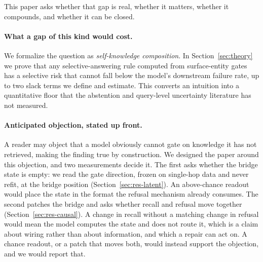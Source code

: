 \documentclass{article}
\begin{document}
This paper asks whether that gap is real, whether it matters, whether it compounds, and whether it
can be closed.

\paragraph{What a gap of this kind would cost.} We formalize the question as \emph{self-knowledge
composition}. In Section~\ref{sec:theory} we prove that any selective-answering rule computed from
surface-entity gates has a selective risk that cannot fall below the model's downstream failure
rate, up to two slack terms we define and estimate. This converts an intuition into a quantitative
floor that the abstention and query-level uncertainty literature
\citep{gottesman2024estimating,kossen2024semantic,chen2026querylevel} has not measured.

\paragraph{Anticipated objection, stated up front.} A reader may object that a model obviously
cannot gate on knowledge it has not retrieved, making the finding true by construction. We designed the paper around this objection, and two measurements decide it. The first asks whether
the bridge state is empty: we read the gate direction, frozen on single-hop data and never refit, at
the bridge position (Section~\ref{sec:res-latent}). An above-chance readout would place the state in
the format the refusal mechanism already consumes. The second patches the bridge and asks whether
recall and refusal move together (Section~\ref{sec:res-causal}). A change in recall without a matching
change in refusal would mean the model computes the state and does not route it, which is a claim
about wiring rather than about information, and which a repair can act on. A chance readout, or a
patch that moves both, would instead support the objection, and we would report that.


\end{document}

